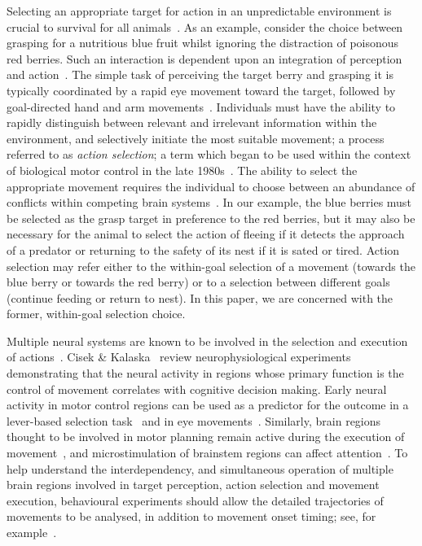 \documentclass[10pt,letterpaper]{article}
\begin{document}
Selecting an appropriate target for action in an unpredictable
environment is crucial to survival for all
animals~\cite{cisek_cortical_2007,pratt_action-centered_1994}. As an
example, consider the choice between grasping for a nutritious blue
fruit whilst ignoring the distraction of poisonous red berries. Such
an interaction is dependent upon an integration of perception and
action~\cite{tipper_actionbased_1998}. The simple task of perceiving
the target berry and grasping it is typically coordinated by a rapid
eye movement toward the target, followed by goal-directed hand and arm
movements~\cite{biguer_coordination_1982,neggers_ocular_2000,neggers_gaze_2001}.
Individuals must have the ability to rapidly distinguish between
relevant and irrelevant information within the environment, and
selectively initiate the most suitable movement; a process referred to
as \emph{action selection}; a term which began to be used within the
context of biological motor control in the late
1980s~\cite{norman_attention_1986,maes_dynamics_1989,maes_situated_1990}. The
ability to select the appropriate movement requires the individual to
choose between an abundance of conflicts within competing brain
systems~\cite{redgrave_basal_1999}. In our example, the blue berries
must be selected as the grasp target in preference to the red berries,
but it may also be necessary for the animal to select the action of
fleeing if it detects the approach of a predator or returning to the
safety of its nest if it is sated or tired. Action selection may refer
either to the within-goal selection of a movement (towards the blue
berry or towards the red berry) or to a selection between different
goals (continue feeding or return to nest). In this paper, we are
concerned with the former, within-goal selection choice.

Multiple neural systems are known to be involved in the selection and
execution of
actions~\cite{cisek_cortical_2007,ueda_encoding_2003,hoshi_distinctions_2007}. Cisek
\& Kalaska~\cite{cisek_neural_2010} review neurophysiological
experiments demonstrating that the neural activity in regions whose
primary function is the control of movement correlates with cognitive
decision making. Early neural activity in motor control regions can be
used as a predictor for the outcome in a lever-based selection
task~\cite{wallis_rule_2003} and in eye
movements~\cite{basso_modulation_1998}. Similarly, brain regions
thought to be involved in motor planning remain active during the
execution of
movement~\cite{cisek_neural_2010,hoshi_distinctions_2007}, and
microstimulation of brainstem regions can affect
attention~\cite{muller_microstimulation_2005}.  To help understand the
interdependency, and simultaneous operation of multiple brain regions
involved in target perception, action selection and movement
execution, behavioural experiments should allow the detailed
trajectories of movements to be analysed, in addition to movement
onset timing; see, for example~\cite{jax_hand_2007}.
\end{document}
